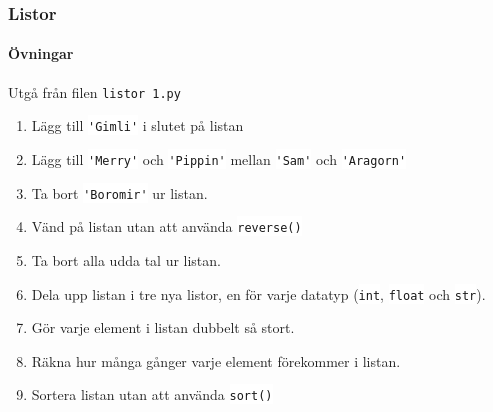 \documentclass{beamer}
\newcommand{\code}[1]{\colorbox{white}{\lstinline{#1}}}
\begin{document}
\begin{frame}
\frametitle{Listor}
\framesubtitle{Övningar}

Utgå från filen \texttt{listor 1.py}

\begin{enumerate}
\item Lägg till \code{'Gimli'} i slutet på listan
\item Lägg till \code{'Merry'} och \code{'Pippin'} mellan \code{'Sam'} och \code{'Aragorn'}
\item Ta bort \code{'Boromir'} ur listan.
\item Vänd på listan utan att använda \code{reverse()}
\item Ta bort alla udda tal ur listan.
\item Dela upp listan i tre nya listor, en för varje datatyp (\code{int}, \code{float} och \code{str}).
\item Gör varje element i listan dubbelt så stort.
\item Räkna hur många gånger varje element förekommer i listan.
\item Sortera listan utan att använda \code{sort()}
\end{enumerate}

\end{frame}
\end{document}
